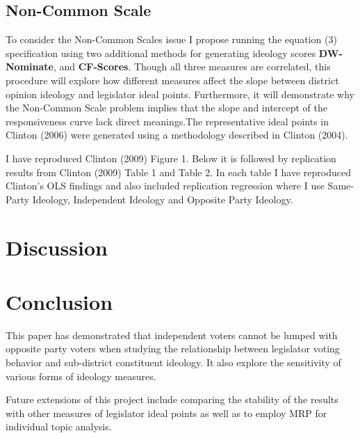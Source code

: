 \documentclass[10pt,letterpaper]{article}
\begin{document}
\newpage


\subsection{Non-Common Scale}
To consider the Non-Common Scales issue I propose running the equation (3) specification using two additional methods for generating ideology scores \textbf{DW-Nominate}, and \textbf{CF-Scores}. Though all three measures are correlated, this procedure will explore how different measures affect the slope between district opinion ideology and legislator ideal points. Furthermore, it will demonstrate why the Non-Common Scale problem implies that the slope and intercept of the responsiveness curve lack direct meanings.The representative ideal points in Clinton (2006) were generated using a methodology described in Clinton (2004).


I have reproduced Clinton (2009) Figure 1. Below it is followed by replication results from Clinton (2009) Table 1 and Table 2. In each table I have reproduced Clinton's OLS findings and also included replication regression where I use Same-Party Ideology, Independent Ideology and Opposite Party Ideology.





\section{Discussion} 







\newpage
%

\newpage


\newpage

\newpage


\section{Conclusion} 
This paper has demonstrated that independent voters cannot be lumped with opposite party voters when studying the relationship between legislator voting behavior and sub-district constituent ideology. It also explore the sensitivity of various forms of ideology measures.

Future extensions of this project include comparing the stability of the results with other measures of legislator ideal points as well as to employ MRP for individual topic analysis.
\end{document}

